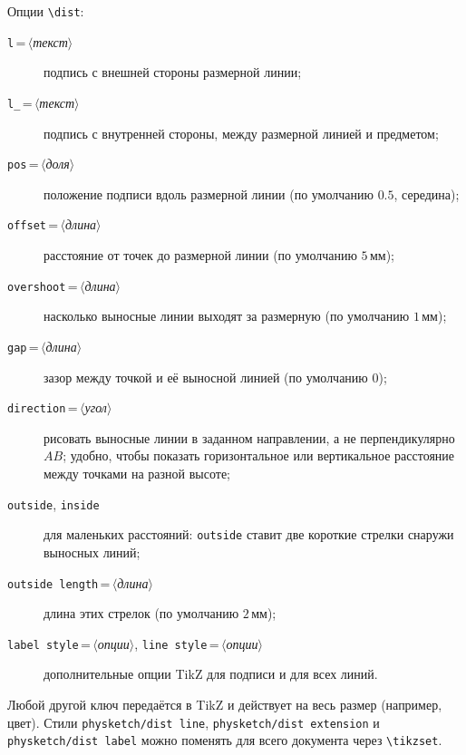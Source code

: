 \documentclass[a4paper,11pt]{article}
\newcommand\cs[1]{\texttt{\textbackslash#1}}
\newcommand\key[1]{\texttt{#1}}
\newcommand\meta[1]{\ensuremath{\langle}\textit{#1}\ensuremath{\rangle}}
\begin{document}
Опции \cs{dist}:
\begin{description}
  \item[\key{l}\,=\,\meta{текст}] подпись с внешней стороны размерной линии;
  \item[\key{l\_}\,=\,\meta{текст}] подпись с внутренней стороны, между
    размерной линией и предметом;
  \item[\key{pos}\,=\,\meta{доля}] положение подписи вдоль размерной линии
    (по умолчанию \(0.5\), середина);
  \item[\key{offset}\,=\,\meta{длина}] расстояние от точек до размерной
    линии (по умолчанию \(5\,\text{мм}\));
  \item[\key{overshoot}\,=\,\meta{длина}] насколько выносные линии выходят
    за размерную (по умолчанию \(1\,\text{мм}\));
  \item[\key{gap}\,=\,\meta{длина}] зазор между точкой и её выносной линией
    (по умолчанию \(0\));
  \item[\key{direction}\,=\,\meta{угол}] рисовать выносные линии в заданном
    направлении, а не перпендикулярно \(AB\); удобно, чтобы показать
    горизонтальное или вертикальное расстояние между точками на разной
    высоте;
  \item[\key{outside}, \key{inside}] для маленьких расстояний: \key{outside}
    ставит две короткие стрелки снаружи выносных линий;
  \item[\key{outside length}\,=\,\meta{длина}] длина этих стрелок (по
    умолчанию \(2\,\text{мм}\));
  \item[\key{label style}\,=\,\meta{опции}, \key{line style}\,=\,\meta{опции}]
    дополнительные опции TikZ для подписи и для всех линий.
\end{description}
Любой другой ключ передаётся в TikZ и действует на весь размер (например,
цвет). Стили \texttt{physketch/dist line}, \texttt{physketch/dist extension}
и \texttt{physketch/dist label} можно поменять для всего документа через
\cs{tikzset}.

\begin{example}
\end{example}
\end{document}
